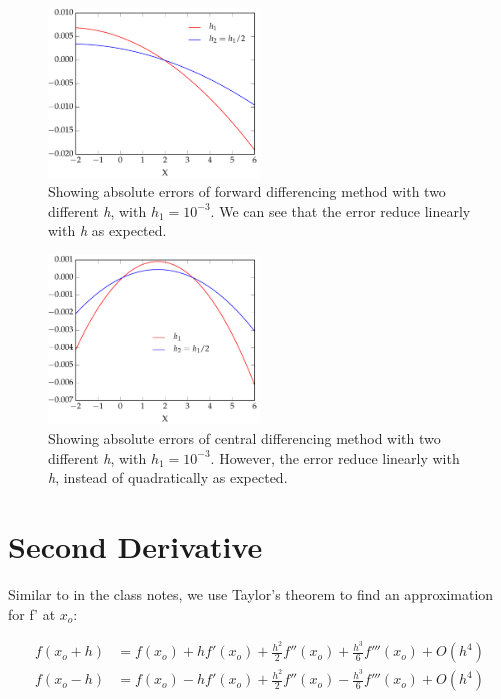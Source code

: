 \documentclass[11pt,letterpaper]{article}
\begin{document}
\begin{figure}[h!]
	\centering
	\includegraphics[width=0.5\textwidth]{ForwardErr}
	\caption{Showing absolute errors of forward differencing method with two different \emph{h}, with $h_1=10^{-3}$. We can see that the error reduce
	linearly with \emph{h} as expected.}
	\label{fig:ForwardErr}
\end{figure}

\begin{figure}[h!]
	\centering
	\includegraphics[width=0.5\textwidth]{CentralErr}
	\caption{Showing absolute errors of central differencing method with two different \emph{h}, with $h_1=10^{-3}$. However, the error reduce
	linearly with \emph{h}, instead of quadratically as expected.}
	\label{fig:CentralErr}
\end{figure}


\newpage

\section{Second Derivative}

Similar to in the class notes, we use Taylor's theorem to find an approximation for f' at $x_o$:

	\begin{align*}
	f(x_o+h) &= f(x_o)+hf'(x_o)+\frac{h^2}{2}f''(x_o) + \frac{h^3}{6}f'''(x_o) + O(h^4) \\
	f(x_o-h) &= f(x_o)-hf'(x_o)+\frac{h^2}{2}f''(x_o) - \frac{h^3}{6}f'''(x_o) + O(h^4)
	\end{align*}
\end{document}
